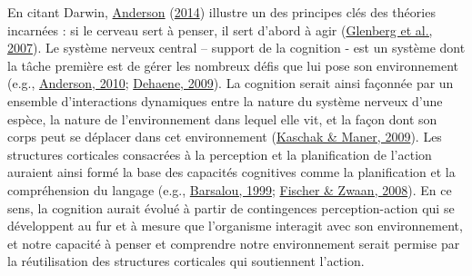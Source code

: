 \documentclass[
  a4paper,12pt,twoside,onecolumn,openright,final,oldfontcommands]{memoir}
\begin{document}
En citant Darwin, \protect\hyperlink{ref-anderson_after_2014}{Anderson} (\protect\hyperlink{ref-anderson_after_2014}{2014}) illustre un des principes clés des théories incarnées : si le cerveau sert à penser, il sert d'abord à agir (\protect\hyperlink{ref-glenberg_what_2007}{Glenberg et al., 2007}). Le système nerveux central -- support de la cognition - est un système dont la tâche première est de gérer les nombreux défis que lui pose son environnement (e.g., \protect\hyperlink{ref-anderson_neural_2010}{Anderson, 2010}; \protect\hyperlink{ref-dehaene_reading_2009}{Dehaene, 2009}). La cognition serait ainsi façonnée par un ensemble d'interactions dynamiques entre la nature du système nerveux d'une espèce, la nature de l'environnement dans lequel elle vit, et la façon dont son corps peut se déplacer dans cet environnement (\protect\hyperlink{ref-kaschak_embodiment_2009}{Kaschak \& Maner, 2009}). Les structures corticales consacrées à la perception et la planification de l'action auraient ainsi formé la base des capacités cognitives comme la planification et la compréhension du langage (e.g., \protect\hyperlink{ref-barsalou_perceptual_1999}{Barsalou, 1999}; \protect\hyperlink{ref-fischer_embodied_2008}{Fischer \& Zwaan, 2008}). En ce sens, la cognition aurait évolué à partir de contingences perception-action qui se développent au fur et à mesure que l'organisme interagit avec son environnement, et notre capacité à penser et comprendre notre environnement serait permise par la réutilisation des structures corticales qui soutiennent l'action.
\end{document}
